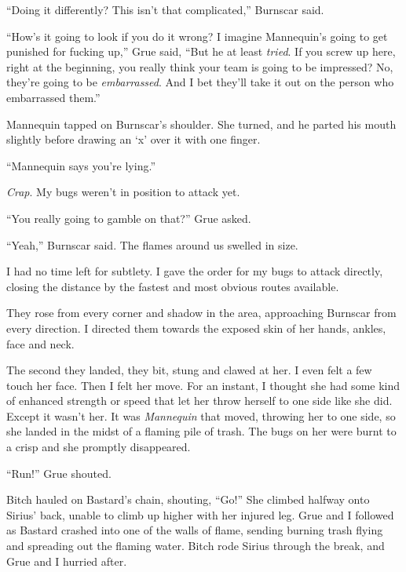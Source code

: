 ``Doing it differently?  This isn't that complicated,'' Burnscar said.



``How's it going to look if you do it wrong?  I imagine Mannequin's going to get punished for fucking up,'' Grue said, ``But he at least \emph{tried}.  If you screw up here, right at the beginning, you really think your team is going to be impressed?  No, they're going to be \emph{embarrassed}.  And I bet they'll take it out on the person who embarrassed them.''



Mannequin tapped on Burnscar's shoulder.  She turned, and he parted his mouth slightly before drawing an `x' over it with one finger.



``Mannequin says you're lying.''



\emph{Crap}.  My bugs weren't in position to attack yet.



``You really going to gamble on that?'' Grue asked.



``Yeah,'' Burnscar said.  The flames around us swelled in size.



I had no time left for subtlety.  I gave the order for my bugs to attack directly, closing the distance by the fastest and most obvious routes available.



They rose from every corner and shadow in the area, approaching Burnscar from every direction.  I directed them towards the exposed skin of her hands, ankles, face and neck.



The second they landed, they bit, stung and clawed at her.  I even felt a few touch her face.  Then I felt her move.  For an instant, I thought she had some kind of enhanced strength or speed that let her throw herself to one side like she did.  Except it wasn't her.  It was \emph{Mannequin} that moved, throwing her to one side, so she landed in the midst of a flaming pile of trash.  The bugs on her were burnt to a crisp and she promptly disappeared.



``Run!'' Grue shouted.



Bitch hauled on Bastard's chain, shouting, ``Go!''  She climbed halfway onto Sirius' back, unable to climb up higher with her injured leg.  Grue and I followed as Bastard crashed into  one of the walls of flame, sending burning trash flying and spreading out the flaming water.  Bitch rode Sirius through the break, and Grue and I hurried after.



